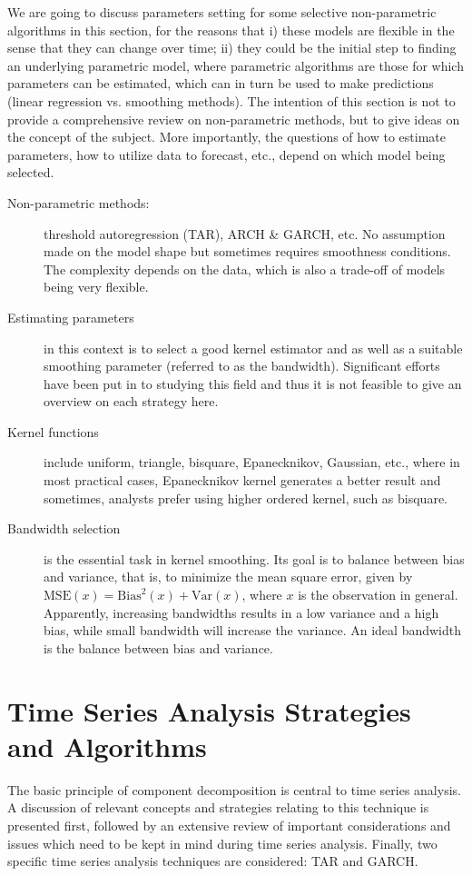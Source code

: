 We are going to discuss parameters setting for some selective non-parametric algorithms in this section, for the reasons that i) these models are flexible in the sense that they can change over time; ii) they could be the initial step to finding an underlying parametric model, where parametric algorithms are those for which parameters can be estimated, which can in turn be used to make predictions (linear regression vs. smoothing methods). The intention of this section is not to provide a comprehensive review on non-parametric methods, but to give ideas on the concept of the subject. More importantly, the questions of how to estimate parameters, how to utilize data to forecast, etc., depend on which model being selected.
\begin{description}
\item[Non-parametric methods:] threshold autoregression (TAR), ARCH \& GARCH, etc.
No assumption made on the model shape but sometimes requires smoothness conditions. The complexity depends on the data, which is also a trade-off of models being very flexible. 
\item[Estimating parameters] in this context is to select a good kernel estimator and as well as a suitable smoothing parameter (referred to as the bandwidth). Significant efforts have been put in to studying this field and thus it is not feasible to give an overview on each strategy here. 
\item[Kernel functions] include uniform, triangle, bisquare, Epanecknikov, Gaussian, etc., where in most practical cases, Epanecknikov kernel generates a better result and sometimes, analysts prefer using higher ordered kernel, such as bisquare.
\item[Bandwidth selection] is the essential task in kernel smoothing. Its goal is to balance between bias and variance, that is, to minimize the mean square error, given by $ \mathrm{MSE}(x) = \mathrm{Bias}^2 (x) + \mathrm{Var}(x) $, where $x$ is the observation in general.
Apparently, increasing bandwidths results in a low variance and a high bias, while small bandwidth will increase the variance. An ideal bandwidth is the balance between bias and variance. 
\end{description}


\section{Time Series Analysis Strategies and Algorithms}

The basic principle of component decomposition is central to time series analysis. A discussion of relevant concepts and strategies relating to this technique is presented first, followed by an extensive review of important considerations and issues which need to be kept in mind during time series analysis. Finally, two specific time series analysis techniques are considered: TAR and GARCH.

